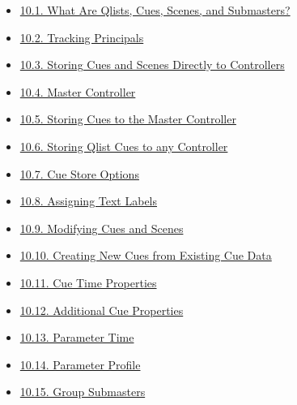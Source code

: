 \documentclass[
]{article}
\providecommand{\tightlist}{%
  \setlength{\itemsep}{0pt}\setlength{\parskip}{0pt}}
\begin{document}
\begin{itemize}
\tightlist
\item
  \href{https://vibemanual.compulite.com/programming-cues-and-scenes.html\#what-are-qlists-cues-scenes-and-submasters}{10.1. What Are Qlists, Cues, Scenes, and Submasters?}
\item
  \href{https://vibemanual.compulite.com/programming-cues-and-scenes.html\#tracking-principals}{10.2. Tracking Principals}
\item
  \href{https://vibemanual.compulite.com/programming-cues-and-scenes.html\#storing-cues-and-scenes-directly-to-controllers}{10.3. Storing Cues and Scenes Directly to Controllers}
\item
  \href{https://vibemanual.compulite.com/programming-cues-and-scenes.html\#master-controller}{10.4. Master Controller}
\item
  \href{https://vibemanual.compulite.com/programming-cues-and-scenes.html\#storing-cues-to-the-master-controller}{10.5. Storing Cues to the Master Controller}
\item
  \href{https://vibemanual.compulite.com/programming-cues-and-scenes.html\#storing-qlist-cues-to-any-controller}{10.6. Storing Qlist Cues to any Controller}
\item
  \href{https://vibemanual.compulite.com/programming-cues-and-scenes.html\#cue-store-options-1}{10.7. Cue Store Options}
\item
  \href{https://vibemanual.compulite.com/programming-cues-and-scenes.html\#assigning-text-labels}{10.8. Assigning Text Labels}
\item
  \href{https://vibemanual.compulite.com/programming-cues-and-scenes.html\#modifying-cues-and-scenes}{10.9. Modifying Cues and Scenes}
\item
  \href{https://vibemanual.compulite.com/programming-cues-and-scenes.html\#creating-new-cues-from-existing-cue-data}{10.10. Creating New Cues from Existing Cue Data}
\item
  \href{https://vibemanual.compulite.com/programming-cues-and-scenes.html\#cue-time-properties}{10.11. Cue Time Properties}
\item
  \href{https://vibemanual.compulite.com/programming-cues-and-scenes.html\#additional-cue-properties}{10.12. Additional Cue Properties}
\item
  \href{https://vibemanual.compulite.com/programming-cues-and-scenes.html\#parameter-time}{10.13. Parameter Time}
\item
  \href{https://vibemanual.compulite.com/programming-cues-and-scenes.html\#parameter-profile}{10.14. Parameter Profile}
\item
  \href{https://vibemanual.compulite.com/programming-cues-and-scenes.html\#group-submasters}{10.15. Group Submasters}
\end{itemize}
\end{document}
